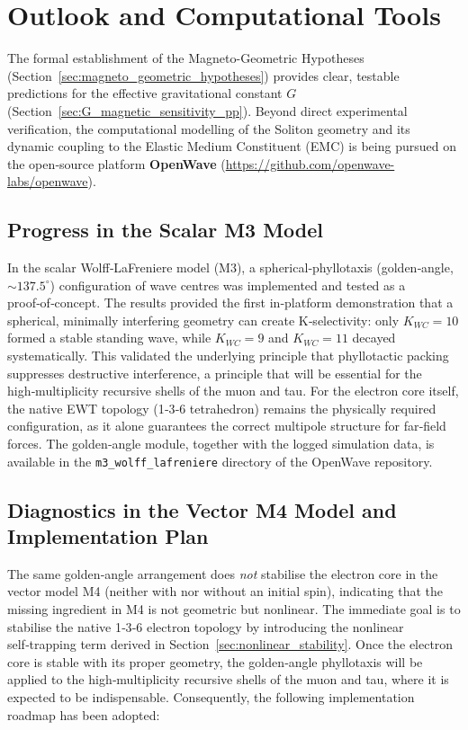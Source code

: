 \documentclass[10pt,a4paper]{article}
\begin{document}
\section{Outlook and Computational Tools}
\label{sec:outlook}

The formal establishment of the Magneto-Geometric Hypotheses
(Section~\ref{sec:magneto_geometric_hypotheses}) provides clear, testable
predictions for the effective gravitational constant $G$
(Section~\ref{sec:G_magnetic_sensitivity_pp}).  Beyond direct experimental
verification, the computational modelling of the Soliton geometry and its
dynamic coupling to the Elastic Medium Constituent (EMC) is being pursued
on the open‑source platform \textbf{OpenWave}
(\url{https://github.com/openwave-labs/openwave}).

\subsection*{Progress in the Scalar M3 Model}

In the scalar Wolff‑LaFreniere model (M3), a spherical‑phyllotaxis
(golden‑angle, $\sim 137.5^{\circ}$) configuration of wave centres was
implemented and tested as a proof‑of‑concept.  The results provided the
first in‑platform demonstration that a spherical, minimally interfering
geometry can create K‑selectivity: only $K_{WC}=10$ formed a stable standing
wave, while $K_{WC}=9$ and $K_{WC}=11$ decayed systematically.  This validated the
underlying principle that phyllotactic packing suppresses destructive
interference, a principle that will be essential for the high‑multiplicity
recursive shells of the muon and tau.  For the
electron core itself, the native EWT topology (1‑3‑6 tetrahedron) remains
the physically required configuration, as it alone guarantees the correct
multipole structure for far‑field forces.  The golden‑angle module,
together with the logged simulation data, is available in the
\texttt{m3\_wolff\_lafreniere} directory of the OpenWave repository.

\subsection*{Diagnostics in the Vector M4 Model and Implementation Plan}

The same golden‑angle arrangement does \emph{not} stabilise the
electron core in the vector model M4 (neither with nor without an
initial spin), indicating that the missing ingredient in M4 is not
geometric but nonlinear.  The immediate goal is to stabilise the native
1‑3‑6 electron topology by introducing the nonlinear self‑trapping term
derived in Section~\ref{sec:nonlinear_stability}.  Once the electron
core is stable with its proper geometry, the golden‑angle phyllotaxis
will be applied to the high‑multiplicity recursive shells of the muon
and tau, where it is expected to be indispensable.
Consequently, the following implementation roadmap has been adopted:
\end{document}
